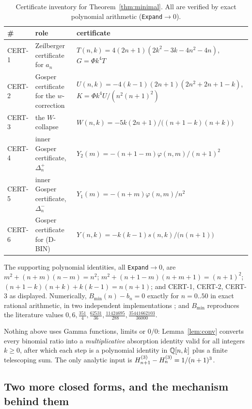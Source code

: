 \begin{table}[ht]
\centering\small
\caption{Certificate inventory for Theorem~\ref{thm:minimal}. All are verified by exact
polynomial arithmetic (\texttt{Expand}$\to0$).}
\label{tab:certs}
\begin{tabular}{@{}llp{6.4cm}@{}}
\toprule
\# & role & certificate\\
\midrule
CERT-1 & Zeilberger certificate for $a_n$ & $T(n,k)=4(2n+1)(2k^2-3k-4n^2-4n)$, $G=\Phi k^4T$\\
CERT-2 & Gosper certificate for the $w$-correction & $U(n,k)=-4(k-1)(2n+1)(2n^2+2n+1-k)$, $K=\Phi k^4U/(n^2(n+1)^2)$\\
CERT-3 & the $W$-collapse & $W(n,k)=-5k(2n+1)/\bigl((n+1-k)(n+k)\bigr)$\\
CERT-4 & inner Gosper certificate, $\Delta^+_n$ & $Y_2(m)=-(n+1-m)\varphi(n,m)/(n+1)^2$\\
CERT-5 & inner Gosper certificate, $\Delta^-_n$ & $Y_1(m)=-(n+m)\varphi(n,m)/n^2$\\
CERT-6 & Gosper certificate for (D-BIN) & $Y(n,k)=-k(k-1)s(n,k)/\bigl(n(n+1)\bigr)$\\
\bottomrule
\end{tabular}
\end{table}

The supporting polynomial identities, all \texttt{Expand}$\to0$, are
$m^2+(n+m)(n-m)=n^2$; $m^2+(n+1-m)(n+m+1)=(n+1)^2$; $(n+1-k)(n+k)+k(k-1)=n(n+1)$; and
CERT-1, CERT-2, CERT-3 as displayed. Numerically, $B_{\min}(n)-b_n=0$ exactly for
$n=0..50$ in exact rational arithmetic, in two independent implementations
; and $B_{\min}$ reproduces the literature values
$0,6,\tfrac{351}4,\tfrac{62531}{36},\tfrac{11424695}{288},\tfrac{35441662103}{36000}$.

\begin{remark}\label{rem:leanfriendly}
Nothing above uses Gamma functions, limits or $0/0$: Lemma~\ref{lem:conv} converts every
binomial ratio into a \emph{multiplicative} absorption identity valid for all integers
$k\ge0$, after which each step is a polynomial identity in $\mathbb{Q}[n,k]$ plus a finite
telescoping sum. The only analytic input is $H^{(3)}_{n+1}-H^{(3)}_{n}=1/(n+1)^3$.
\end{remark}

\subsection{Two more closed forms, and the mechanism behind them}

